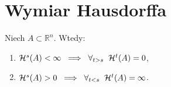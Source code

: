 \documentclass{mini}
\begin{document}
\section{Wymiar Hausdorffa}

\begin{lem}
Niech $A \subset \mathbb{R}^n$. Wtedy:

\begin{enumerate}
\item $\mathcal{H}^s(A)<\infty\hspace{2mm} \Longrightarrow\hspace{2mm} \forall_{t>s}\hspace{2mm} \mathcal{H}^t(A)=0 $,\\
\item $\mathcal{H}^s(A)>0\hspace{2mm}\Longrightarrow\hspace{2mm}\forall_{t<s}\hspace{2mm} \mathcal{H}^t(A)=\infty $.
\end{enumerate}

\end{lem}
\end{document}
